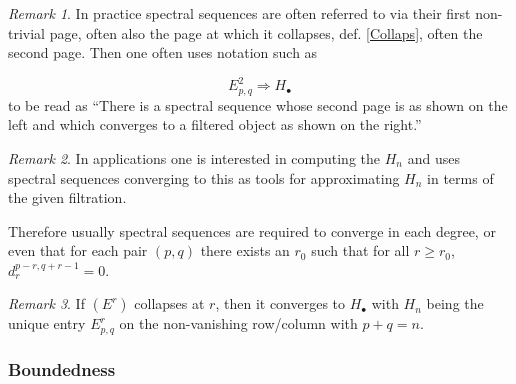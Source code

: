 \documentclass[12pt,titlepage]{article}
\theoremstyle{plain}
\theoremstyle{definition}
\theoremstyle{remark}
\newtheorem{remark}{Remark}
\begin{document}
\begin{remark}
In practice spectral sequences are often referred to via their first non-trivial page, often also the page at which it collapses, def. \ref{Collaps}, often the second page. Then one often uses notation such as

\begin{displaymath}
E^2_{p,q} \Rightarrow H_\bullet
\end{displaymath}
to be read as ``There is a spectral sequence whose second page is as shown on the left and which converges to a filtered object as shown on the right.''

\end{remark}
\begin{remark}
In applications one is interested in computing the $H_n$ and uses spectral sequences converging to this as tools for approximating $H_n$ in terms of the given filtration.

Therefore usually spectral sequences are required to converge in each degree, or even that for each pair $(p,q)$ there exists an $r_0$ such that for all $r\geq r_0$, $d_r^{p-r,q+r-1} = 0$.

\end{remark}
\begin{remark}
If $(E^r)$ collapses at $r$, then it converges to $H_\bullet$ with $H_n$ being the unique entry $E_{p,q}^r$ on the non-vanishing row/column with $p+q = n$.

\end{remark}
\hypertarget{Boundedness}{}\subsubsection*{{Boundedness}}\label{Boundedness}
\end{document}
